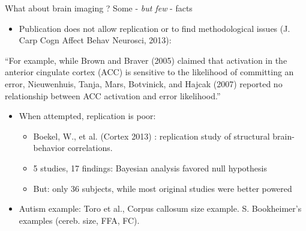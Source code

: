 \documentclass[ignorenonframetext,]{beamer}
\begin{document}
\begin{frame}{What about brain imaging ? Some - \emph{but few} - facts}

\begin{itemize}[<+->]
\itemsep1pt\parskip0pt
\item
  Publication does not allow replication or to find methodological
  issues (J. Carp Cogn Affect Behav Neurosci, 2013):
\end{itemize}

``For example, while Brown and Braver (2005) claimed that activation in
the anterior cingulate cortex (ACC) is sensitive to the likelihood of
committing an error, Nieuwenhuis, Tanja, Mars, Botvinick, and Hajcak
(2007) reported no relationship between ACC activation and error
likelihood.''

\begin{itemize}[<+->]
\itemsep1pt\parskip0pt
\item
  When attempted, replication is poor:

  \begin{itemize}[<+->]
  \itemsep1pt\parskip0pt
  \item
    Boekel, W., et al. (Cortex 2013) : replication study of structural
    brain-behavior correlations.
  \item
    5 studies, 17 findings: Bayesian analysis favored null hypothesis
  \item
    But: only 36 subjects, while most original studies were better
    powered
  \end{itemize}
\end{itemize}

\begin{itemize}[<+->]
\itemsep1pt\parskip0pt
\item
  Autism example: Toro et al., Corpus callosum size example. S.
  Bookheimer's examples (cereb. size, FFA, FC).
\end{itemize}


\end{frame}
\end{document}
